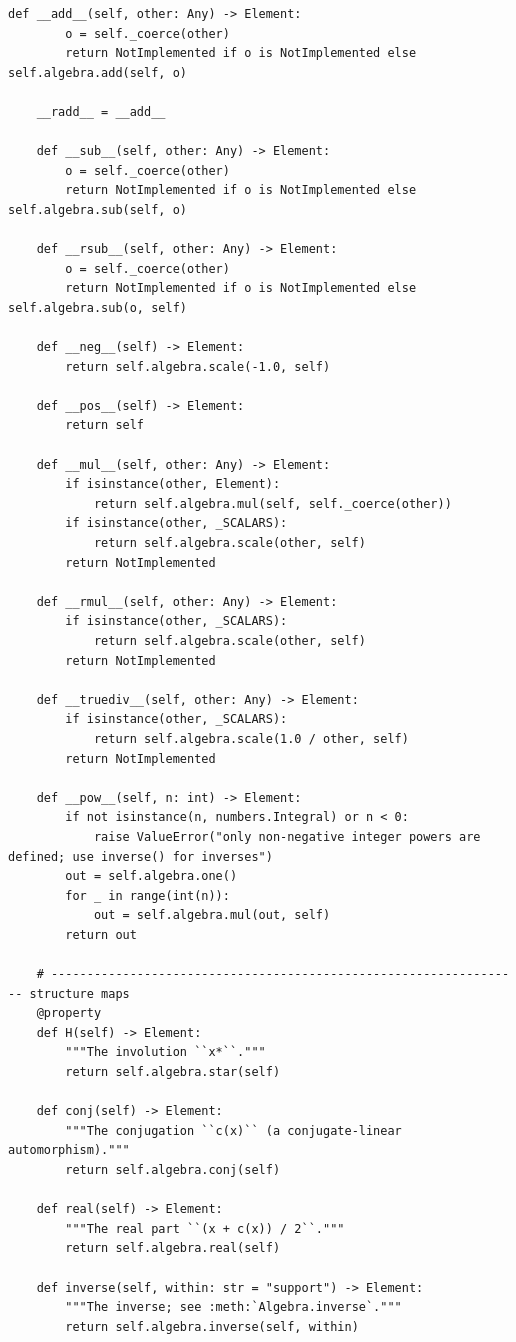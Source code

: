 \documentclass[12pt, a4paper]{report}
\theoremstyle{plain}
\theoremstyle{definition}
\theoremstyle{remark}
\theoremstyle{plain}
\begin{document}
\begin{lstlisting}[style=dsqcode]
    def __add__(self, other: Any) -> Element:
        o = self._coerce(other)
        return NotImplemented if o is NotImplemented else self.algebra.add(self, o)

    __radd__ = __add__

    def __sub__(self, other: Any) -> Element:
        o = self._coerce(other)
        return NotImplemented if o is NotImplemented else self.algebra.sub(self, o)

    def __rsub__(self, other: Any) -> Element:
        o = self._coerce(other)
        return NotImplemented if o is NotImplemented else self.algebra.sub(o, self)

    def __neg__(self) -> Element:
        return self.algebra.scale(-1.0, self)

    def __pos__(self) -> Element:
        return self

    def __mul__(self, other: Any) -> Element:
        if isinstance(other, Element):
            return self.algebra.mul(self, self._coerce(other))
        if isinstance(other, _SCALARS):
            return self.algebra.scale(other, self)
        return NotImplemented

    def __rmul__(self, other: Any) -> Element:
        if isinstance(other, _SCALARS):
            return self.algebra.scale(other, self)
        return NotImplemented

    def __truediv__(self, other: Any) -> Element:
        if isinstance(other, _SCALARS):
            return self.algebra.scale(1.0 / other, self)
        return NotImplemented

    def __pow__(self, n: int) -> Element:
        if not isinstance(n, numbers.Integral) or n < 0:
            raise ValueError("only non-negative integer powers are defined; use inverse() for inverses")
        out = self.algebra.one()
        for _ in range(int(n)):
            out = self.algebra.mul(out, self)
        return out

    # ------------------------------------------------------------------ structure maps
    @property
    def H(self) -> Element:
        """The involution ``x*``."""
        return self.algebra.star(self)

    def conj(self) -> Element:
        """The conjugation ``c(x)`` (a conjugate-linear automorphism)."""
        return self.algebra.conj(self)

    def real(self) -> Element:
        """The real part ``(x + c(x)) / 2``."""
        return self.algebra.real(self)

    def inverse(self, within: str = "support") -> Element:
        """The inverse; see :meth:`Algebra.inverse`."""
        return self.algebra.inverse(self, within)


\end{lstlisting}
\end{document}
